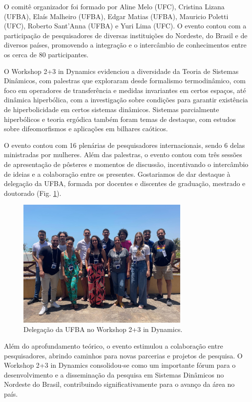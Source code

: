 \documentclass{hipatia}
\begin{document}
O comitê organizador foi formado por Aline Melo (UFC), Cristina Lizana (UFBA), Elaís Malheiro (UFBA), Edgar Matias (UFBA), Mauricio Poletti (UFC), Roberto Sant'Anna (UFBA) e Yuri Lima (UFC). O evento contou com a participação de pesquisadores de diversas instituições do Nordeste, do Brasil e de diversos países, promovendo a integração e o intercâmbio de conhecimentos entre os cerca de 80 participantes.


O Workshop 2+3 in Dynamics evidenciou a diversidade da Teoria de Sistemas Dinâmicos, com palestras que exploraram desde formalismo termodinâmico, com foco em operadores de transferência e medidas invariantes em certos espaços, até dinâmica hiperbólica, com a investigação sobre condições para garantir existência de hiperbolicidade em certos sistemas dinâmicos.  Sistemas parcialmente hiperbólicos e teoria ergódica também foram temas de destaque, com estudos sobre  difeomorfismos e  aplicações em  bilhares caóticos.

 O evento contou com 16 plenárias de pesquisadores internacionais, sendo 6 delas ministradas por mulheres. Além das palestras, o evento contou com três sessões de apresentação de pôsteres e momentos de discussão, incentivando o intercâmbio de ideias e a colaboração entre os presentes. Gostariamos de dar destaque à delegação da UFBA, formada por docentes e discentes de graduação, mestrado e doutorado (Fig. \ref{workshop1}).


\begin{figure}[htb]
    \centering
    \includegraphics[width=8.5cm]{Workshop1.jpg}
    \caption{Delegação da UFBA no Workshop 2+3 in Dynamics.}
 \label{workshop1}
\end{figure}


Além do aprofundamento teórico, o evento estimulou a colaboração entre pesquisadores, abrindo caminhos para novas parcerias e projetos de pesquisa.  O Workshop 2+3 in Dynamics consolidou-se como um importante fórum para o desenvolvimento e a disseminação da pesquisa em Sistemas Dinâmicos no Nordeste do Brasil, contribuindo significativamente para o avanço da área no país.
\end{document}
